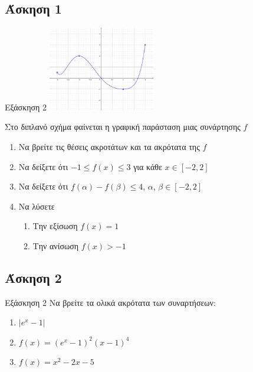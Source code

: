 \documentclass{presentation}
\begin{document}
\subsection{Άσκηση 1}
\begin{frame}[label=Άσκηση1,t]{Εξάσκηση 2}
      \centering
      \includegraphics[width=0.35\textwidth]{"images/1.3.2 Μονοτονία.png"}

      Στο διπλανό σχήμα φαίνεται η γραφική παράσταση μιας συνάρτησης $f$
      \begin{enumerate}
            \item Να βρείτε τις θέσεις ακροτάτων και τα ακρότατα της $f$\pause
            \item Να δείξετε ότι $-1\le f(x) \le 3$ για κάθε $x\in[-2,2]$\pause
            \item Να δείξετε ότι $f(α)-f(β)\le 4$, $α$, $β\in[-2,2]$ \pause
            \item Να λύσετε
                  \begin{enumerate}
                        \item Την εξίσωση $f(x)=1$ \pause
                        \item Την ανίσωση $f(x)>-1$
                  \end{enumerate}
      \end{enumerate}
\end{frame}

\subsection{Άσκηση 2}
\begin{frame}[label=Άσκηση2,t]{Εξάσκηση 2}
      Να βρείτε τα ολικά ακρότατα των συναρτήσεων:
      \begin{enumerate}
            \item $|e^x-1|$ \pause
            \item $f(x)=(e^x-1)^2(x-1)^4$ \pause
            \item $f(x)=x^2-2x-5$
      \end{enumerate}
\end{frame}
\end{document}
